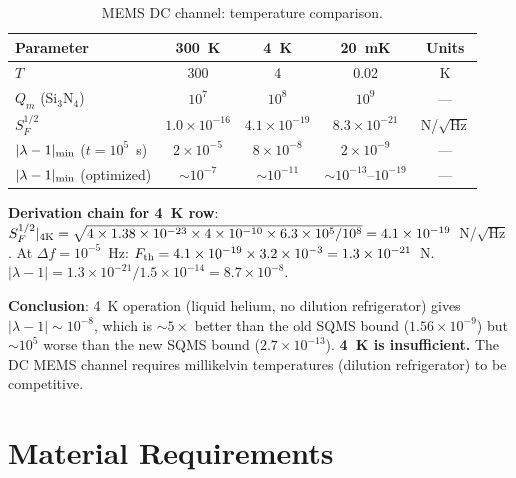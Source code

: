 \documentclass[11pt]{article}
\newcommand{\ee}[1]{\times 10^{#1}}
\newcommand{\lbone}{|\lambda - 1|}
\theoremstyle{definition}
\theoremstyle{remark}
\begin{document}
\begin{table}[H]
\centering
\caption{MEMS DC channel: temperature comparison.}
\label{tab:mems_temp}
\renewcommand{\arraystretch}{1.3}
\begin{tabular}{@{}lcccc@{}}
\toprule
\textbf{Parameter} & \textbf{300~K} & \textbf{4~K}
& \textbf{20~mK} & \textbf{Units} \\
\midrule
$T$ & 300 & 4 & 0.02 & K \\
$Q_m$ (Si$_3$N$_4$) & $10^7$ & $10^8$ & $10^9$ & --- \\
$S_F^{1/2}$ & $1.0\ee{-16}$ & $4.1\ee{-19}$
& $8.3\ee{-21}$ & N/$\sqrt{\text{Hz}}$ \\
$\lbone_{\rm min}$ ($t = 10^5$~s) & $2\ee{-5}$ & $8\ee{-8}$
& $2\ee{-9}$ & --- \\
$\lbone_{\rm min}$ (optimized) & $\sim 10^{-7}$ & $\sim 10^{-11}$
& $\sim 10^{-13}$--$10^{-19}$ & --- \\
\bottomrule
\end{tabular}
\end{table}

\textbf{Derivation chain for 4~K row}: $S_F^{1/2}|_{4\rm K}
= \sqrt{4 \times 1.38\ee{-23} \times 4 \times 10^{-10}
\times 6.3\ee{5} / 10^8} = 4.1\ee{-19}$~N/$\sqrt{\text{Hz}}$.
At $\Delta f = 10^{-5}$~Hz: $F_{\rm th} = 4.1\ee{-19} \times
3.2\ee{-3} = 1.3\ee{-21}$~N. $\lbone = 1.3\ee{-21}/1.5\ee{-14}
= 8.7\ee{-8}$.

\textbf{Conclusion}: 4~K operation (liquid helium, no dilution
refrigerator) gives $\lbone \sim 10^{-8}$, which is $\sim 5\times$
better than the old SQMS bound ($1.56\ee{-9}$) but $\sim 10^5$ worse
than the new SQMS bound ($2.7\ee{-13}$). \textbf{4~K is insufficient.}
The DC MEMS channel requires millikelvin temperatures (dilution
refrigerator) to be competitive.

\section{Material Requirements}
\end{document}
